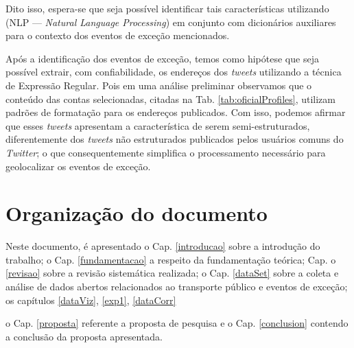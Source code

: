 \documentclass[
	12pt,				%
	oneside,			%
	a4paper,			%
	english,			%
	brazil				%
	]{abntex2ppgsi}
\begin{document}
Dito isso, espera-se que seja possível identificar tais características utilizando  (NLP --- \textit{Natural Language Processing}) em conjunto com dicionários auxiliares para o contexto dos eventos de exceção mencionados.

Após a identificação dos eventos de exceção, temos como hipótese que seja possível extrair, com confiabilidade, os endereços dos \textit{tweets} utilizando a técnica de Expressão Regular. Pois em uma análise preliminar observamos que o conteúdo das contas selecionadas, citadas na Tab. \ref{tab:oficialProfiles}, utilizam padrões de formatação para os endereços publicados. Com isso, podemos afirmar que esses \textit{tweets} apresentam a característica de serem semi-estruturados, diferentemente dos \textit{tweets} não estruturados publicados pelos usuários comuns do \textit{Twitter}; o que consequentemente simplifica o processamento necessário para geolocalizar os eventos de exceção.

\section{Organização do documento}
\label{docOrg}

Neste documento, é apresentado o Cap. \ref{introducao} sobre a introdução do trabalho; o Cap. \ref{fundamentacao} a respeito da fundamentação teórica;  Cap. o \ref{revisao} sobre a revisão sistemática realizada; o Cap. \ref{dataSet} sobre a coleta e análise de dados abertos relacionados ao transporte público e eventos de exceção; os capítulos \ref{dataViz}, \ref{exp1}, \ref{dataCorr}

o Cap. \ref{proposta} referente a proposta de pesquisa e o Cap. \ref{conclusion} contendo a conclusão da proposta apresentada.

% 
%
%
%
%
\end{document}
